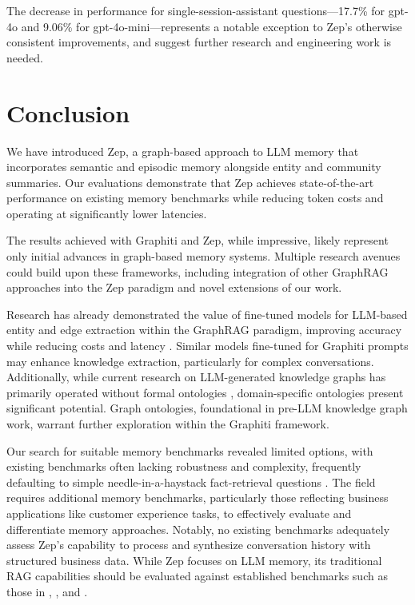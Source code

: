 \documentclass{article}
\begin{document}
The decrease in performance for single-session-assistant questions—17.7\% for gpt-4o and 9.06\% for gpt-4o-mini—represents a notable exception to Zep's otherwise consistent improvements, and suggest further research and engineering work is needed.




\section{Conclusion}
We have introduced Zep, a graph-based approach to LLM memory that incorporates semantic and episodic memory alongside entity and community summaries. Our evaluations demonstrate that Zep achieves state-of-the-art performance on existing memory benchmarks while reducing token costs and operating at significantly lower latencies.

The results achieved with Graphiti and Zep, while impressive, likely represent only initial advances in graph-based memory systems. Multiple research avenues could build upon these frameworks, including integration of other GraphRAG approaches into the Zep paradigm and novel extensions of our work.

Research has already demonstrated the value of fine-tuned models for LLM-based entity and edge extraction within the GraphRAG paradigm, improving accuracy while reducing costs and latency \cite{synthkg}\cite{triplex}. Similar models fine-tuned for Graphiti prompts may enhance knowledge extraction, particularly for complex conversations. Additionally, while current research on LLM-generated knowledge graphs has primarily operated without formal ontologies \cite{arigraph}\cite{graphrag}\cite{lightrag}\cite{synthkg}\cite{graphreader}, domain-specific ontologies present significant potential. Graph ontologies, foundational in pre-LLM knowledge graph work, warrant further exploration within the Graphiti framework.

Our search for suitable memory benchmarks revealed limited options, with existing benchmarks often lacking robustness and complexity, frequently defaulting to simple needle-in-a-haystack fact-retrieval questions \cite{memgpt}. The field requires additional memory benchmarks, particularly those reflecting business applications like customer experience tasks, to effectively evaluate and differentiate memory approaches. Notably, no existing benchmarks adequately assess Zep's capability to process and synthesize conversation history with structured business data. While Zep focuses on LLM memory, its traditional RAG capabilities should be evaluated against established benchmarks such as those in \cite{lightrag}, \cite{financebench}, and \cite{beir}.
\end{document}
